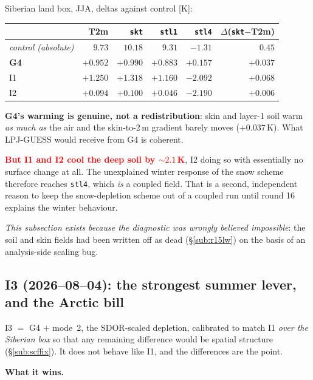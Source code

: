 \documentclass[10pt]{article}
\begin{document}
Siberian land box, JJA, deltas against control [K]:

\begin{center}\footnotesize
\begin{tabular}{l r r r r r}
\toprule
 & T2m & \texttt{skt} & \texttt{stl1} & \texttt{stl4} & $\Delta$(\texttt{skt}$-$T2m) \\
\midrule
\emph{control (absolute)} & $9.73$ & $10.18$ & $9.31$ & $-1.31$ & $0.45$ \\
\textbf{G4} & $+0.952$ & $\mathbf{+0.990}$ & $\mathbf{+0.883}$ & $+0.157$ & $+0.037$ \\
I1 & $+1.250$ & $+1.318$ & $+1.160$ & $\mathbf{-2.092}$ & $+0.068$ \\
I2 & $+0.094$ & $+0.100$ & $+0.046$ & $\mathbf{-2.190}$ & $+0.006$ \\
\bottomrule
\end{tabular}
\end{center}

\noindent \textbf{G4's warming is genuine, not a redistribution}: skin and layer-1 soil warm
\emph{as much as} the air and the skin-to-2\,m gradient barely moves ($+0.037$\,K). What
LPJ-GUESS would receive from G4 is coherent.

\textcolor{red}{\textbf{But I1 and I2 cool the deep soil by ${\sim}2.1$\,K}}, I2 doing so with
essentially no surface change at all. The unexplained winter response of the snow scheme
therefore reaches \texttt{stl4}, which \emph{is} a coupled field. That is a second, independent
reason to keep the snow-depletion scheme out of a coupled run until round 16 explains the
winter behaviour.

\emph{This subsection exists because the diagnostic was wrongly believed impossible}: the soil
and skin fields had been written off as dead (\S\ref{sub:r15lw}) on the basis of an
analysis-side scaling bug.

\subsection{I3 (2026--08--04): the strongest summer lever, and the Arctic bill}\label{sub:i3}
I3 $=$ G4 $+$ mode~2, the SDOR-scaled depletion, calibrated to match I1 \emph{over the
Siberian box} so that any remaining difference would be spatial structure
(\S\ref{sub:scffix}). It does not behave like I1, and the differences are the point.

\textbf{What it wins.}
\end{document}
